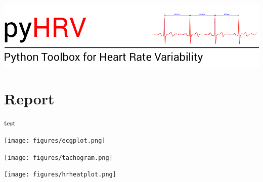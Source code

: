 \documentclass[9pt]{article}
\begin{document}
    \begin{center}
        \includegraphics[width=\textwidth]{pyhrv.png}
    \end{center}
    
    \section{Report}

    

    \ifecgsignal
        test
        \begin{center}
            \texttt{[image: figures/ecgplot.png]}
            \vspace{-5mm}
        \end{center}
        \vspace{-5mm}
    \fi

    \iftachogram
        \begin{center}
            \texttt{[image: figures/tachogram.png]}
        \end{center}
    \vspace{-5mm}
    \fi

    \ifhrheatplot
        \begin{center}
            \texttt{[image: figures/hrheatplot.png]}
        \end{center}
        \vspace{-5mm}
    \fi

    \iftdomain  \fi
    
    \iffdomain  \fi

    \ifndomain   \fi

    

    \label{page:lastpage}
\end{document}
